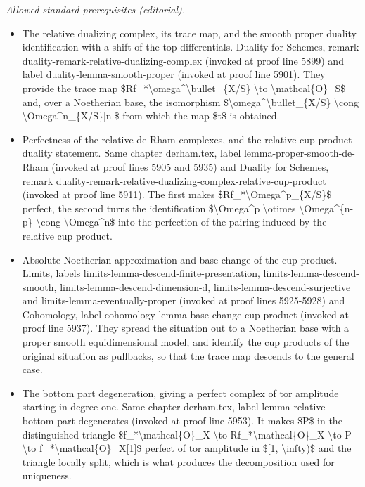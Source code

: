 \documentclass[10pt,a4paper]{amsart}
\theoremstyle{plain}
\theoremstyle{definition}
\theoremstyle{remark}
\numberwithin{equation}{subsection}
\begin{document}
\noindent\textit{Allowed standard prerequisites (editorial).}\begin{itemize}
\item The relative dualizing complex, its trace map, and the smooth proper duality identification with a shift of the top differentials. Duality for Schemes, remark duality-remark-relative-dualizing-complex (invoked at proof line 5899) and label duality-lemma-smooth-proper (invoked at proof line 5901). They provide the trace map \$Rf\_*\textbackslash{}omega\textasciicircum{}\textbackslash{}bullet\_\{X/S\} \textbackslash{}to \textbackslash{}mathcal\{O\}\_S\$ and, over a Noetherian base, the isomorphism \$\textbackslash{}omega\textasciicircum{}\textbackslash{}bullet\_\{X/S\} \textbackslash{}cong \textbackslash{}Omega\textasciicircum{}n\_\{X/S\}[n]\$ from which the map \$t\$ is obtained.
\item Perfectness of the relative de Rham complexes, and the relative cup product duality statement. Same chapter derham.tex, label lemma-proper-smooth-de-Rham (invoked at proof lines 5905 and 5935) and Duality for Schemes, remark duality-remark-relative-dualizing-complex-relative-cup-product (invoked at proof line 5911). The first makes \$Rf\_*\textbackslash{}Omega\textasciicircum{}p\_\{X/S\}\$ perfect, the second turns the identification \$\textbackslash{}Omega\textasciicircum{}p \textbackslash{}otimes \textbackslash{}Omega\textasciicircum{}\{n-p\} \textbackslash{}cong \textbackslash{}Omega\textasciicircum{}n\$ into the perfection of the pairing induced by the relative cup product.
\item Absolute Noetherian approximation and base change of the cup product. Limits, labels limits-lemma-descend-finite-presentation, limits-lemma-descend-smooth, limits-lemma-descend-dimension-d, limits-lemma-descend-surjective and limits-lemma-eventually-proper (invoked at proof lines 5925-5928) and Cohomology, label cohomology-lemma-base-change-cup-product (invoked at proof line 5937). They spread the situation out to a Noetherian base with a proper smooth equidimensional model, and identify the cup products of the original situation as pullbacks, so that the trace map descends to the general case.
\item The bottom part degeneration, giving a perfect complex of tor amplitude starting in degree one. Same chapter derham.tex, label lemma-relative-bottom-part-degenerates (invoked at proof line 5953). It makes \$P\$ in the distinguished triangle \$f\_*\textbackslash{}mathcal\{O\}\_X \textbackslash{}to Rf\_*\textbackslash{}mathcal\{O\}\_X \textbackslash{}to P \textbackslash{}to f\_*\textbackslash{}mathcal\{O\}\_X[1]\$ perfect of tor amplitude in \$[1, \textbackslash{}infty)\$ and the triangle locally split, which is what produces the decomposition used for uniqueness.
\end{itemize}\medskip
\end{document}
